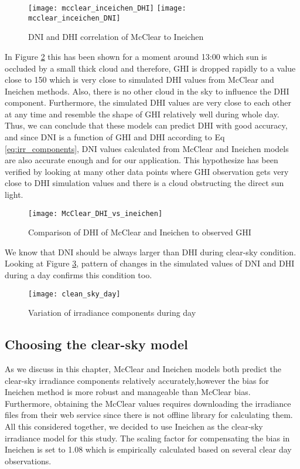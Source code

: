 \begin{figure}[h]
\caption{DNI and DHI correlation of McClear to Ineichen}
\label{fig:mcclear_vs_Ineichen_DNI_DHI}
\texttt{[image: mcclear\_inceichen\_DHI]}
\texttt{[image: mcclear\_inceichen\_DNI]}
\centering
\end{figure}

In Figure \ref{fig:McClear_DHI_vs_ineichen} this has been shown for a moment around 13:00 which sun is occluded by a small thick cloud and therefore, GHI is dropped rapidly to a value close to 150 which is very close to simulated DHI values from McClear and Ineichen methods. Also, there is no other cloud in the sky to influence the DHI component. Furthermore, the simulated DHI values are very close to each other at any time and resemble the shape of GHI relatively well during whole day. Thus, we can conclude that these models can predict DHI with good accuracy, and since DNI is a function of GHI and DHI according to Eq \ref{eq:irr_components}, DNI values calculated from McClear and Ineichen models are also accurate enough and for our application. This hypothesize has been verified by looking at many other data points where GHI observation gets very close to DHI simulation values and there is a cloud obstructing the direct sun light.

\begin{figure}[h]
\caption{Comparison of DHI of McClear and Ineichen to observed GHI}
\label{fig:McClear_DHI_vs_ineichen}
\texttt{[image: McClear\_DHI\_vs\_ineichen]}
\centering
\end{figure}

We know that DNI should be always larger than DHI during clear-sky condition. Looking at Figure \ref{fig:clean_sky_day_irr}, pattern of changes in the simulated values of DNI and DHI during a day confirms this condition too.

\begin{figure}[h]
\caption{Variation of irradiance components during day}
\label{fig:clean_sky_day_irr}
\texttt{[image: clean\_sky\_day]}
\centering
\end{figure}

\subsection{Choosing the clear-sky model}
As we discuss in this chapter, McClear and Ineichen models both predict the clear-sky irradiance components relatively accurately,however the bias for Ineichen method is more robust and manageable than McClear bias. Furthermore, obtaining the McClear values requires downloading the irradiance files from their web service since there is not offline library for calculating them. All this considered together, we decided to use Ineichen as the clear-sky irradiance model for this study. The scaling factor for compensating the bias in Ineichen is set to 1.08 which is empirically calculated based on several clear day observations.

